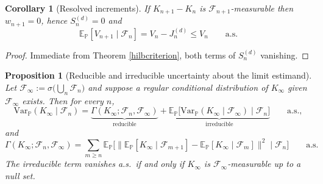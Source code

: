 \documentclass{article}
\newcommand{\Var}{\mathrm{Var}_{\mathbb{P}}}
\newcommand{\E}{\mathbb{E}_{\mathbb{P}}}
\newcommand{\F}{\mathcal{F}}
\newcommand{\1}{\mathbbm{1}}
\newtheorem{prop}{Proposition}
\newtheorem{cor}{Corollary}
\begin{document}
\begin{cor}[Resolved increments]
\label{resolved}
If $K_{n+1}-K_n$ is $\F_{n+1}$-measurable then $w_{n+1}=0$, hence $S_n^{(d)}=0$ and
\[
\E[V_{n+1}\mid\F_n]=V_n-J_n^{(d)}\le V_n\qquad\text{a.s.}
\]
\end{cor}

\begin{proof}
Immediate from Theorem \ref{hilbcriterion}, both terms of $S_n^{(d)}$ vanishing.
\end{proof}

\begin{prop}[Reducible and irreducible uncertainty about the limit estimand]
\label{reducible}
Let $\F_\infty:=\sigma\big(\bigcup_n\F_n\big)$ and suppose a regular conditional distribution of
$K_\infty$ given $\F_\infty$ exists. Then for every $n$,
\[
\Var(K_\infty\mid\F_n)
=\underbrace{\Gamma(K_\infty;\F_n,\F_\infty)}_{\text{reducible}}
+\underbrace{\E\big[\Var(K_\infty\mid\F_\infty)\mid\F_n\big]}_{\text{irreducible}}
\qquad\text{a.s.},
\]
and
\[
\Gamma(K_\infty;\F_n,\F_\infty)
=\sum_{m\ge n}\E\Big[\big\|\E[K_\infty\mid\F_{m+1}]-\E[K_\infty\mid\F_m]\big\|^2\;\Big|\;\F_n\Big]
\qquad\text{a.s.}
\]
The irreducible term vanishes a.s.\ if and only if $K_\infty$ is $\F_\infty$-measurable up to a null
set.
\end{prop}
\end{document}
